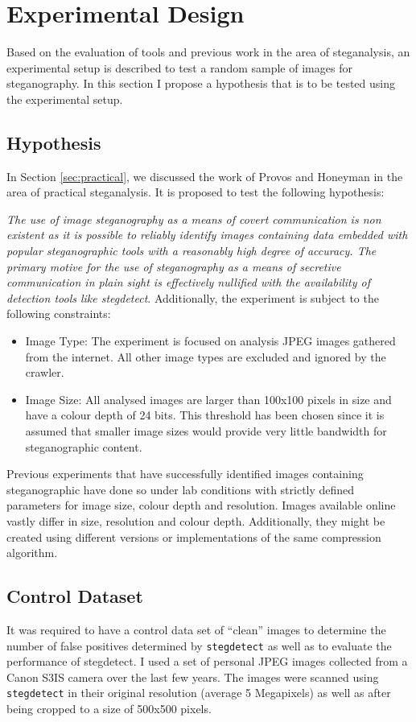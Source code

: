 \chapter{Experimental Design}
\label{ch:dev}
Based on the evaluation of tools and previous work in the area of
steganalysis, an experimental setup is described to test a random sample
of images for steganography. In this section I propose a hypothesis that
is to be tested using the experimental setup. 
\section{Hypothesis}
\label{sec:hypothesis}
In Section \ref{sec:practical}, we discussed the work of Provos and
Honeyman in the area of practical steganalysis. It is proposed to test
the following hypothesis:
\par
\emph{The use of image steganography as a means of covert communication
is non existent as it is possible to reliably identify images containing
data embedded with popular steganographic tools with a reasonably high
degree of accuracy. The primary motive for the use of steganography as a
means of secretive communication in plain sight is effectively nullified
with the availability of detection tools like stegdetect}. 
Additionally, the experiment is subject to the following constraints:
\begin{itemize}
\item{Image Type}: The experiment is focused on analysis JPEG images
gathered from the internet. All other image types are excluded and
ignored by the crawler.
\item{Image Size}: All analysed images are larger than 100x100 pixels in
size and have a colour depth of 24 bits. This threshold has been chosen since it 
is assumed that smaller image sizes would provide very little bandwidth
for steganographic content.
\end{itemize}
\par  Previous experiments that have successfully identified images containing steganographic have done so under lab conditions with strictly defined parameters for image size, colour depth and resolution. Images available online vastly differ in size, resolution and colour depth. Additionally, they might be created using different versions or implementations of the same compression algorithm. 

\section{Control Dataset}
\label{sec:control}
It was required to have a control data set of ``clean'' images to
determine the number of false positives determined by
\texttt{stegdetect} as well as to evaluate the performance of stegdetect. I used a set of personal JPEG images collected from
a Canon S3IS camera over the last few years. The images were scanned
using \texttt{stegdetect} in their original resolution (average 5
Megapixels) as well as after
being cropped to a size of 500x500 pixels.



